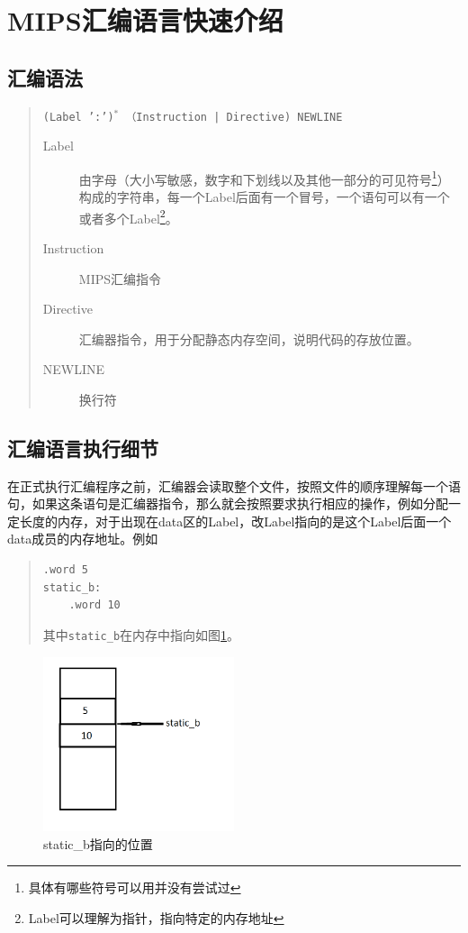 \documentclass[a4paper, 11pt]{article}
\begin{document}
\section{MIPS汇编语言快速介绍}
\subsection{汇编语法}
	\begin{quotation}
		\texttt{(Label ':')$^*$ （Instruction | Directive) NEWLINE}
		\begin{description}
			\item [Label] 由字母（大小写敏感，数字和下划线以及其他一部分的可见符号\footnote{具体有哪些符号可以用并没有尝试过}）构成的字符串，每一个Label后面有一个冒号，一个语句可以有一个或者多个Label\footnote{Label可以理解为指针，指向特定的内存地址}。
			\item [Instruction] MIPS汇编指令
			\item [Directive] 汇编器指令，用于分配静态内存空间，说明代码的存放位置。
			\item [NEWLINE] 换行符
		\end{description}
	\end{quotation}
\subsection{汇编语言执行细节}
	在正式执行汇编程序之前，汇编器会读取整个文件，按照文件的顺序理解每一个语句，如果这条语句是汇编器指令，那么就会按照要求执行相应的操作，例如分配一定长度的内存，对于出现在data区的Label，改Label指向的是这个Label后面一个data成员的内存地址。例如
	
	\begin{quotation}
\begin{lstlisting}[frame=single]
	.word 5
static_b:
	.word 10
\end{lstlisting}
	其中\texttt{static\_b}在内存中指向如图\ref{fig:static-b}。
	\end{quotation}
	\begin{figure}[htbp]
		\centering
		\includegraphics[width=0.5\textwidth]{label-to-data}
		\caption{static\_b指向的位置}
		\label{fig:static-b}
	\end{figure}
\end{document}

